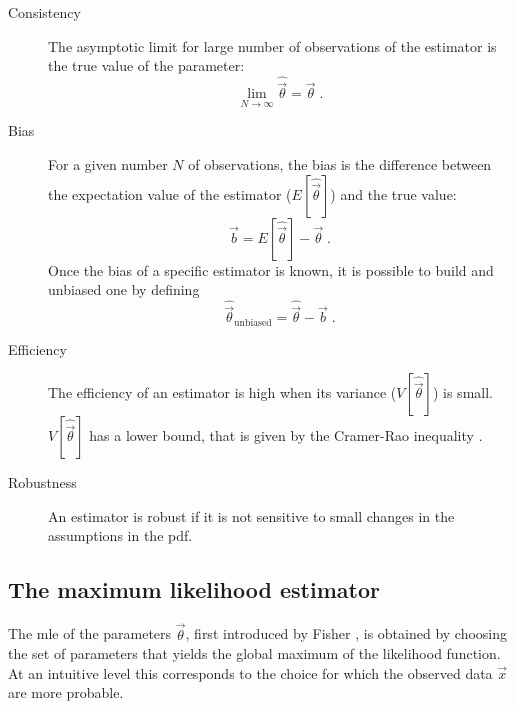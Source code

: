 \begin{description}
\item[Consistency] The asymptotic limit for large number of observations of the estimator is the true value of the parameter:
\begin{equation}
\label{eq:stat:consistency}
\lim_{N \rightarrow \infty} \hat{\vec{\theta}} = \vec{\theta} \; .
\end{equation}

\item[Bias] For a given number $N$ of observations, the bias is the difference between the expectation value of the estimator ($E[\hat{\vec{\theta}}]$) and the true value:
\begin{equation}
\label{eq:stat:bias}
\vec{b} = E[\hat{\vec{\theta}}] - \vec{\theta} \; .
\end{equation}
Once the bias of a specific estimator is known, it is possible to build and unbiased one by defining 
\begin{equation}
\hat{\vec{\theta}}_{\mathrm{unbiased}} = \hat{\vec{\theta}} - \vec{b} \; .
\end{equation}

\item[Efficiency] The efficiency of an estimator is high when its variance ($V[\hat{\vec{\theta}}]$) is small. $V[\hat{\vec{\theta}}]$ has a lower bound, that is given by the Cramer-Rao inequality \cite{Cramer1946,Rao1992}.


\item[Robustness] An estimator is robust if it is not sensitive to small changes in the assumptions in the \gls{pdf}.
\end{description}



\subsection{The maximum likelihood estimator}
\label{sec:stat:MLE}

The \gls{mle} of the parameters $\vec{\theta}$, first introduced by Fisher \cite{fisher1911absolute,aldrich1997}, is obtained by choosing the set of parameters that yields the global maximum of the likelihood function. At an intuitive level this corresponds to the choice for which the observed data $\vec{x}$ are more probable. 

